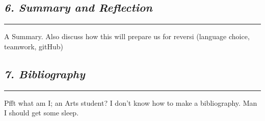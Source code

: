 \documentclass[10pt]{article}
\begin{document}
\begin{multicols}{2}
\subsection*{\emph { \textmd{6. Summary and Reflection}}}
\hrule
\vspace{0.4cm}

A Summary. Also discuss how this will prepare us for reversi (language choice,
teamwork, gitHub)


\subsection*{\emph { \textmd{7. Bibliography}}}
\hrule
\vspace{0.4cm}
Pfft what am I; an Arts student? I don't know how to make a bibliography.
Man I should get some sleep.
\end{multicols} 
\end{document}
